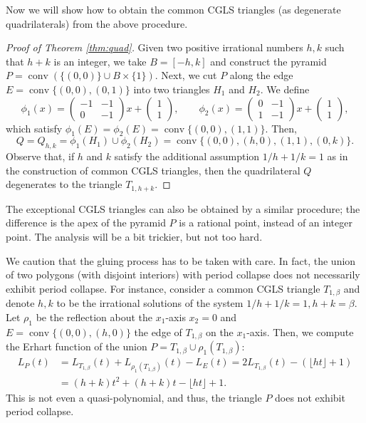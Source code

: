 \documentclass[a4paper]{article}
\DeclareMathOperator{\conv}{conv}
\begin{document}
Now we will show how to obtain the common CGLS triangles (as degenerate quadrilaterals) from the above procedure. 

\begin{proof}[Proof of Theorem \ref{thm:quad}]
Given two positive irrational numbers $h, k$ such that $h + k$ is an integer, we take $B = [-h,k]$ and construct the pyramid $P = \conv(\{(0,0)\} \cup B \times \{1\})$. Next, we cut $P$ along the edge $E = \conv\{(0,0), (0,1)\}$ into two triangles $H_1$ and $H_2$. We define
\[ \phi_1 (x) = \left(\begin{matrix} -1 & -1 \\ 0 & -1 \end{matrix}\right) x + \left(\begin{matrix} 1 \\ 1 \end{matrix}\right), \qquad
	\phi_2 (x) = \left(\begin{matrix} 0 & -1 \\ 1 & -1 \end{matrix}\right) x + \left(\begin{matrix} 1 \\ 1 \end{matrix}\right), \]
which satisfy $\phi_1(E) = \phi_2(E) = \conv\{(0,0),(1,1) \}$. Then, $$Q = Q_{h,k} =  \phi_1(H_1) \cup \phi_2(H_2) = \conv\{(0,0),(h,0),(1,1),(0,k)\}.$$ Observe that, if $h$ and $k$ satisfy the additional assumption $1/h + 1/k = 1$ as in the construction of common CGLS triangles, then the quadrilateral $Q$ degenerates to the triangle $T_{1,h+k}$.
\end{proof}

The exceptional CGLS triangles can also be obtained by a similar procedure; the difference is the apex of the pyramid $P$ is a rational point, instead of an integer point. The analysis will be a bit trickier, but not too hard.

We caution that the gluing process has to be taken with care. In fact, the union of two polygons (with disjoint interiors) with period collapse does not necessarily exhibit period collapse. For instance, consider a common CGLS triangle $T_{1,\beta}$ and denote $h,k$ to be the irrational solutions of the system $1/h + 1/k = 1, h + k = \beta$. Let $\rho_1$ be the reflection about the $x_1$-axis $x_2 = 0$ and $E = \conv \{(0,0), (h,0)\}$ the edge of $T_{1,\beta}$ on the $x_1$-axis. Then, we compute the Erhart function of the union $P = T_{1,\beta} \cup \rho_1(T_{1,\beta})$:
\begin{align}
	L_P(t) &= L_{T_{1,\beta}} (t) + L_{\rho_1 (T_{1,\beta})} (t) - L_E (t) = 2 L_{T_{1,\beta}} (t) - (\lfloor ht \rfloor + 1) \nonumber \\
    	&= (h+k) t^2 + (h+k) t - \lfloor ht \rfloor + 1.
\end{align}
This is not even a quasi-polynomial, and thus, the triangle $P$ does not exhibit period collapse.
\end{document}
